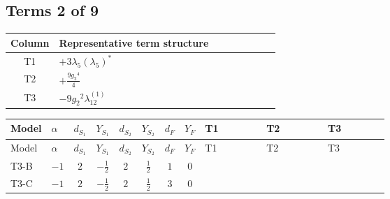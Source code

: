 \documentclass[8pt]{article}
\begin{document}
\begin{landscape}
\subsection*{Terms 2 of 9}
\begin{center}
\begin{tabular}{@{}c >{\raggedright\arraybackslash}p{0.82\linewidth}@{}}
\toprule
Column & Representative term structure \\
\midrule
T1 & \(\displaystyle +3 {\lambda_5} \left({\lambda_5}\right)^{*}\) \\
\midrule
T2 & \(\displaystyle +\frac{9 {g_2}^4}{4}\) \\
\midrule
T3 & \(\displaystyle -9 {g_2}^2 {\lambda_{12}^{(1)}}\) \\
\midrule
\bottomrule
\end{tabular}
\end{center}
\smallskip
\tiny
\begin{longtable}{@{}llcccccc >{\raggedright\arraybackslash}p{0.21\linewidth} >{\raggedright\arraybackslash}p{0.21\linewidth} >{\raggedright\arraybackslash}p{0.21\linewidth}@{}}
\toprule
Model & $\alpha$ & $d_{S_1}$ & $Y_{S_1}$ & $d_{S_2}$ & $Y_{S_2}$ & $d_F$ & $Y_F$ & T1 & T2 & T3 \\
\midrule
\endfirsthead
\toprule
Model & $\alpha$ & $d_{S_1}$ & $Y_{S_1}$ & $d_{S_2}$ & $Y_{S_2}$ & $d_F$ & $Y_F$ & T1 & T2 & T3 \\
\midrule
\endhead
T3-B & $-1$ & $2$ & $-\frac{1}{2}$ & $2$ & $\frac{1}{2}$ & $1$ & $0$ & \scriptsize\adjustbox{max width=\linewidth}{$\begin{gathered} +3 {\lambda_5} \left({\lambda_5}\right)^{*}\end{gathered}$} & \scriptsize\adjustbox{max width=\linewidth}{$\begin{gathered} +\frac{9 {g_2}^4}{4}\end{gathered}$} & \scriptsize\adjustbox{max width=\linewidth}{$\begin{gathered} -9 {g_2}^2 {\lambda_{12}^{(1)}}\end{gathered}$} \\
\midrule
T3-C & $-1$ & $2$ & $-\frac{1}{2}$ & $2$ & $\frac{1}{2}$ & $3$ & $0$ & \scriptsize\adjustbox{max width=\linewidth}{$\begin{gathered} +3 {\lambda_5} \left({\lambda_5}\right)^{*}\end{gathered}$} & \scriptsize\adjustbox{max width=\linewidth}{$\begin{gathered} +\frac{9 {g_2}^4}{4}\end{gathered}$} & \scriptsize\adjustbox{max width=\linewidth}{$\begin{gathered} -9 {g_2}^2 {\lambda_{12}^{(1)}}\end{gathered}$} \\

\end{longtable}
\end{landscape}
\end{document}
